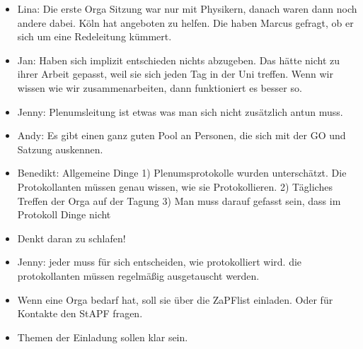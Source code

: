 \begin{itemize}
      \item Lina: Die erste Orga Sitzung war nur mit Physikern, danach waren dann noch andere dabei. Köln hat angeboten zu helfen. Die haben Marcus gefragt, ob er sich um eine Redeleitung kümmert.
      \item Jan: Haben sich implizit entschieden nichts abzugeben. Das hätte nicht zu ihrer Arbeit gepasst, weil sie sich jeden Tag in der Uni treffen. Wenn wir wissen wie wir zusammenarbeiten, dann funktioniert es besser so.
      \item Jenny: Plenumsleitung ist etwas was man sich nicht zusätzlich antun muss.
      \item Andy: Es gibt einen ganz guten Pool an Personen, die sich mit der GO und Satzung auskennen.
      \item Benedikt: Allgemeine Dinge 1) Plenumsprotokolle wurden unterschätzt. Die Protokollanten müssen genau wissen, wie sie Protokollieren. 2) Tägliches Treffen der Orga auf der Tagung 3) Man muss darauf gefasst sein, dass im Protokoll Dinge nicht
      \item Denkt daran zu schlafen!
      \item Jenny: jeder muss für sich entscheiden, wie protokolliert wird. die protokollanten müssen regelmäßig ausgetauscht werden.
      \item Wenn eine Orga bedarf hat, soll sie über die ZaPFlist einladen. Oder für Kontakte den StAPF fragen.
      \item Themen der Einladung sollen klar sein.
    \end{itemize}
